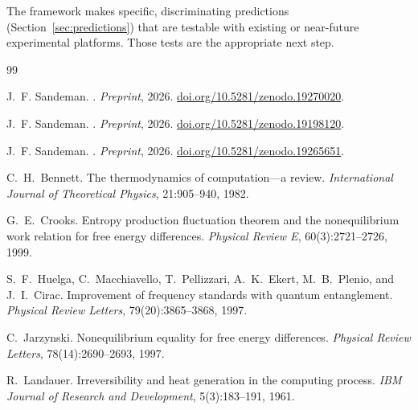 \documentclass[11pt,a4paper]{article}
\theoremstyle{plain}
\theoremstyle{definition}
\theoremstyle{remark}
\begin{document}
The framework makes specific, discriminating predictions (Section~\ref{sec:predictions})
that are testable with existing or near-future experimental platforms. Those tests
are the appropriate next step.

\begin{thebibliography}{99}

J.~F. Sandeman.
.
\newblock \textit{Preprint}, 2026.
\newblock \href{https://doi.org/10.5281/zenodo.19270020}{doi.org/10.5281/zenodo.19270020}.


J.~F. Sandeman.
.
\newblock \textit{Preprint}, 2026.
\newblock \href{https://doi.org/10.5281/zenodo.19198120}{doi.org/10.5281/zenodo.19198120}.


J.~F. Sandeman.
.
\newblock \textit{Preprint}, 2026.
\newblock \href{https://doi.org/10.5281/zenodo.19265651}{doi.org/10.5281/zenodo.19265651}.


C.~H.~Bennett.
\newblock The thermodynamics of computation---a review.
\newblock \textit{International Journal of Theoretical Physics}, 21:905--940,
  1982.

G.~E.~Crooks.
\newblock Entropy production fluctuation theorem and the nonequilibrium work
  relation for free energy differences.
\newblock \textit{Physical Review E}, 60(3):2721--2726, 1999.


S.~F.~Huelga, C.~Macchiavello, T.~Pellizzari, A.~K.~Ekert, M.~B.~Plenio, and
  J.~I.~Cirac.
\newblock Improvement of frequency standards with quantum entanglement.
\newblock \textit{Physical Review Letters}, 79(20):3865--3868, 1997.

C.~Jarzynski.
\newblock Nonequilibrium equality for free energy differences.
\newblock \textit{Physical Review Letters}, 78(14):2690--2693, 1997.

R.~Landauer.
\newblock Irreversibility and heat generation in the computing process.
\newblock \textit{IBM Journal of Research and Development}, 5(3):183--191, 1961.


\end{thebibliography}
\end{document}
